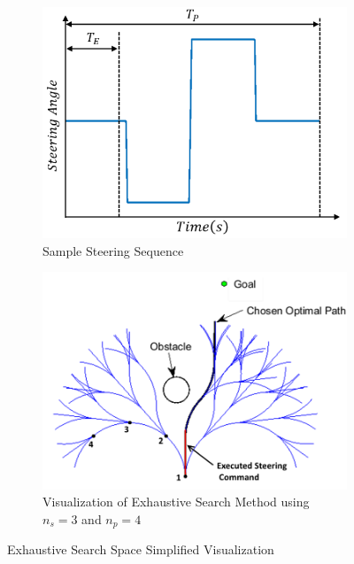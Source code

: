 \documentclass[12pt,onecolumn]{report}
\begin{document}
\begin{figure}
	\centering
	\begin{subfigure}[t]{0.49\columnwidth}
		\centering
		\includegraphics[width=\columnwidth]{Figs/steeringSequence.png}
		\caption{{\small Sample Steering Sequence}}   
		\label{fig:Paths}
	\end{subfigure}
	\hfill
	\begin{subfigure}[t]{0.49\columnwidth}
		\centering
		\includegraphics[width=\columnwidth]{Figs/exhaustObst.png}
		\caption{\small Visualization of Exhaustive Search Method using $n_s=3$ and $n_p=4$}   
		\label{fig:PathsSafe}
	\end{subfigure}
	\caption{\small Exhaustive Search Space Simplified Visualization}
	\label{fig:SimplePaths}
\end{figure}
\end{document}
